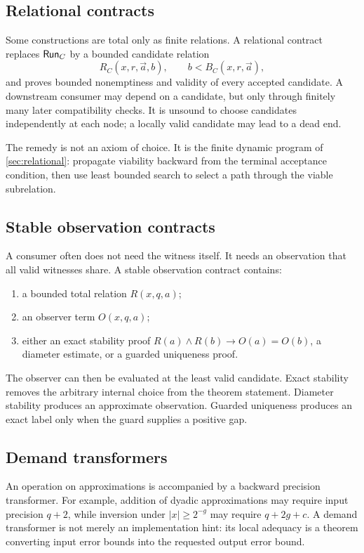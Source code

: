 \subsection{Relational contracts}

Some constructions are total only as finite relations.  A relational contract replaces \(\mathsf{Run}_C\) by a bounded candidate relation
\[
  R_C(x,r,\vec a,b),\qquad b<B_C(x,r,\vec a),
\]
and proves bounded nonemptiness and validity of every accepted candidate.  A downstream consumer may depend on a candidate, but only through finitely many later compatibility checks.  It is unsound to choose candidates independently at each node; a locally valid candidate may lead to a dead end.

The remedy is not an axiom of choice.  It is the finite dynamic program of \cref{sec:relational}: propagate viability backward from the terminal acceptance condition, then use least bounded search to select a path through the viable subrelation.

\subsection{Stable observation contracts}

A consumer often does not need the witness itself.  It needs an observation that all valid witnesses share.  A stable observation contract contains:
\begin{enumerate}[label=(\roman*)]
  \item a bounded total relation \(R(x,q,a)\);
  \item an observer term \(O(x,q,a)\);
  \item either an exact stability proof \(R(a)\wedge R(b)\to O(a)=O(b)\), a diameter estimate, or a guarded uniqueness proof.
\end{enumerate}
The observer can then be evaluated at the least valid candidate.  Exact stability removes the arbitrary internal choice from the theorem statement.  Diameter stability produces an approximate observation.  Guarded uniqueness produces an exact label only when the guard supplies a positive gap.

\subsection{Demand transformers}

An operation on approximations is accompanied by a backward precision transformer.  For example, addition of dyadic approximations may require input precision \(q+2\), while inversion under \(|x|\ge 2^{-g}\) may require \(q+2g+c\).  A demand transformer is not merely an implementation hint: its local adequacy is a theorem converting input error bounds into the requested output error bound.


